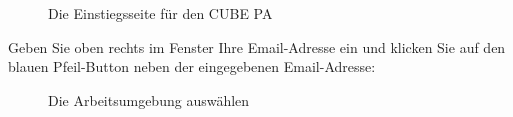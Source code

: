 \begin{figure}[H]
\caption{Die Einstiegsseite für den CUBE PA}
\end{figure}

Geben Sie oben rechts im Fenster Ihre Email-Adresse ein und klicken Sie auf den blauen Pfeil-Button neben der eingegebenen Email-Adresse:

\begin{figure}[H]
\caption{Die Arbeitsumgebung auswählen}
\end{figure}


